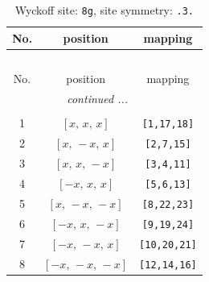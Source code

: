\documentclass[fleqn,8pt]{jsarticle}
\begin{document}
\renewcommand{\arraystretch}{1.2}
\begin{longtable}{ccc}
\caption{Wyckoff site: {\tt 8g}, site symmetry: {\tt .3.}}
 \\
 \hline \hline
No. & position & mapping \\ \hline \endfirsthead

\multicolumn{2}{l}{\tablename\ \thetable{}} \\
 \hline \hline
No. & position & mapping \\ \hline \endhead

 \hline \hline
\multicolumn{2}{r}{\footnotesize\it continued ...} \\ \endfoot

 \hline \hline
\multicolumn{2}{r}{} \\ \endlastfoot

1 & $\left[ x,\, x,\, x \right]$ & {\tt [1,17,18]} \\ \hline
2 & $\left[ x,\, - x,\, x \right]$ & {\tt [2,7,15]} \\ \hline
3 & $\left[ x,\, x,\, - x \right]$ & {\tt [3,4,11]} \\ \hline
4 & $\left[ - x,\, x,\, x \right]$ & {\tt [5,6,13]} \\ \hline
5 & $\left[ x,\, - x,\, - x \right]$ & {\tt [8,22,23]} \\ \hline
6 & $\left[ - x,\, x,\, - x \right]$ & {\tt [9,19,24]} \\ \hline
7 & $\left[ - x,\, - x,\, x \right]$ & {\tt [10,20,21]} \\ \hline
8 & $\left[ - x,\, - x,\, - x \right]$ & {\tt [12,14,16]} \\
\end{longtable}
\renewcommand{\arraystretch}{1.2}
\end{document}
